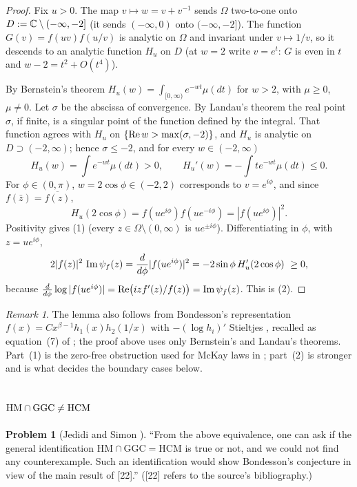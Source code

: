 \documentclass[11pt]{amsart}
\theoremstyle{definition}
\newtheorem{problem}[theorem]{Problem}
\theoremstyle{remark}
\newtheorem{remark}[theorem]{Remark}
\begin{document}
\begin{proof}
Fix $u>0$. The map $v\mapsto w=v+v^{-1}$ sends $\Omega$ two-to-one onto
$D:=\mathbb{C}\setminus(-\infty,-2]$ (it sends $(-\infty,0)$ onto
$(-\infty,-2]$). The function $G(v)=f(uv)f(u/v)$ is analytic on $\Omega$ and
invariant under $v\mapsto1/v$, so it descends to an analytic function
$H_u$ on $D$ (at $w=2$ write $v=e^t$: $G$ is even in $t$ and $w-2=t^2+O(t^4)$).

By Bernstein's theorem $H_u(w)=\int_{[0,\infty)}e^{-wt}\mu(dt)$ for $w>2$, with
$\mu\ge0$, $\mu\ne0$. Let $\sigma$ be the abscissa of convergence. By Landau's
theorem \cite[Chapter~II, Theorem~5b]{R7-Widder41} the real point $\sigma$,
if finite, is a singular point of the function defined by the integral. That
function agrees with $H_u$ on $\{\operatorname{Re} w>\max(\sigma,-2)\}$, and $H_u$ is
analytic on $D\supset(-2,\infty)$; hence $\sigma\le-2$, and for every
$w\in(-2,\infty)$
\[
 H_u(w)=\int e^{-wt}\mu(dt)>0,\qquad H_u'(w)=-\int te^{-wt}\mu(dt)\le0 .
\]
For $\phi\in(0,\pi)$, $w=2\cos\phi\in(-2,2)$ corresponds to $v=e^{i\phi}$, and
since $f(\bar z)=\overline{f(z)}$,
\[
 H_u(2\cos\phi)=f(ue^{i\phi})f(ue^{-i\phi})=|f(ue^{i\phi})|^2 .
\]
Positivity gives (1) (every $z\in\Omega\setminus(0,\infty)$ is $ue^{\pm i\phi}$).
Differentiating in $\phi$, with $z=ue^{i\phi}$,
\[
 2|f(z)|^2\,\operatorname{Im}\psi_f(z)=\frac{d}{d\phi}|f(ue^{i\phi})|^2
 =-2\sin\phi\,H_u'(2\cos\phi)\ \ge 0 ,
\]
because $\frac{d}{d\phi}\log|f(ue^{i\phi})|=\operatorname{Re}\bigl(iz f'(z)/f(z)\bigr)=
\operatorname{Im}\psi_f(z)$. This is (2).
\end{proof}

\begin{remark}
The lemma also follows from Bondesson's representation
$f(x)=Cx^{\beta-1}h_1(x)h_2(1/x)$ with $-(\log h_i)'$ Stieltjes
\cite[(5.2.3), Theorem~5.3.1]{R7-Bondesson92}, recalled as equation~(7) of
\cite{R7-BondessonSimon18}; the proof above uses only Bernstein's and Landau's
theorems. Part~(1) is the zero-free obstruction used for McKay laws in
\cite{K-029}; part~(2) is stronger and is what decides the boundary cases below.
\end{remark}

\subsection{\texorpdfstring{$\mathrm{HM}\cap\mathrm{GGC}\ne\mathrm{HCM}$}{HM and GGC versus HCM}}
\label{R7-ssec-JS}

\begin{problem}[{Jedidi and Simon \cite[Remark~4.1(b)]{R7-JS13}}]
\label{R7-prob-JS}
``From the above equivalence, one can ask if the general identification
$\mathrm{HM}\cap\mathrm{GGC}=\mathrm{HCM}$ is true or not, and we could not
find any counterexample. Such an identification would show Bondesson's
conjecture in view of the main result of [22].'' ([22] refers to the source's
bibliography.)
\end{problem}
\end{document}
